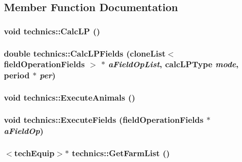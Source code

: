 \subsection{Member Function Documentation}
\hypertarget{classtechnics_a2eb11f92d4788a35a493d238b1c2dab5}{
\subsubsection[{CalcLP}]{\setlength{\rightskip}{0pt plus 5cm}void technics::CalcLP ()}}
\label{classtechnics_a2eb11f92d4788a35a493d238b1c2dab5}
\hypertarget{classtechnics_a3df73c58483ecfca1efdccc7e296bc20}{
\subsubsection[{CalcLPFields}]{\setlength{\rightskip}{0pt plus 5cm}double technics::CalcLPFields ({\bf cloneList}$<$ {\bf fieldOperationFields} $>$ $\ast$ {\em aFieldOpList}, \/  {\bf calcLPType} {\em mode}, \/  {\bf period} $\ast$ {\em per})}}
\label{classtechnics_a3df73c58483ecfca1efdccc7e296bc20}
\hypertarget{classtechnics_a881455e5f5a830ccc89f53df17f6fc78}{
\subsubsection[{ExecuteAnimals}]{\setlength{\rightskip}{0pt plus 5cm}void technics::ExecuteAnimals ()}}
\label{classtechnics_a881455e5f5a830ccc89f53df17f6fc78}
\hypertarget{classtechnics_ae0675e9047b1367a29954b723afb2494}{
\subsubsection[{ExecuteFields}]{\setlength{\rightskip}{0pt plus 5cm}void technics::ExecuteFields ({\bf fieldOperationFields} $\ast$ {\em aFieldOp})}}
\label{classtechnics_ae0675e9047b1367a29954b723afb2494}
\hypertarget{classtechnics_ad2b4807ba763ac388ab4d6c234924824}{
\subsubsection[{GetFarmList}]{$<${\bf techEquip}$>$$\ast$ technics::GetFarmList ()}}
